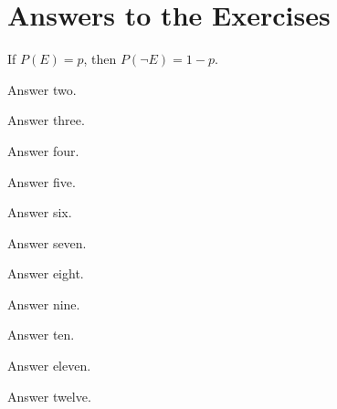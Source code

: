 \documentclass{book}
\begin{document}
\appendix
\chapter{Answers to the Exercises}\label{answers}
\renewcommand{\thechapter}{\arabic{chapter}}
\begin{answer}
If $P(E) = p$, then $P(\neg E) = 1 - p$.
\end{answer}

\begin{answer}%
  Answer two.
\end{answer}

\begin{answer}%
  Answer three.
\end{answer}

\begin{answer}%
  Answer four.
\end{answer}

\begin{answer}%
  Answer five.
\end{answer}

\begin{answer}%
  Answer six.
\end{answer}

\begin{answer}%
  Answer seven.
\end{answer}

\begin{answer}%
  Answer eight.
\end{answer}

\begin{answer}%
  Answer nine.
\end{answer}

\begin{answer}%
  Answer ten.
\end{answer}

\begin{answer}%
  Answer eleven.
\end{answer}

\begin{answer}%
  Answer twelve.
\end{answer}
\end{document}
